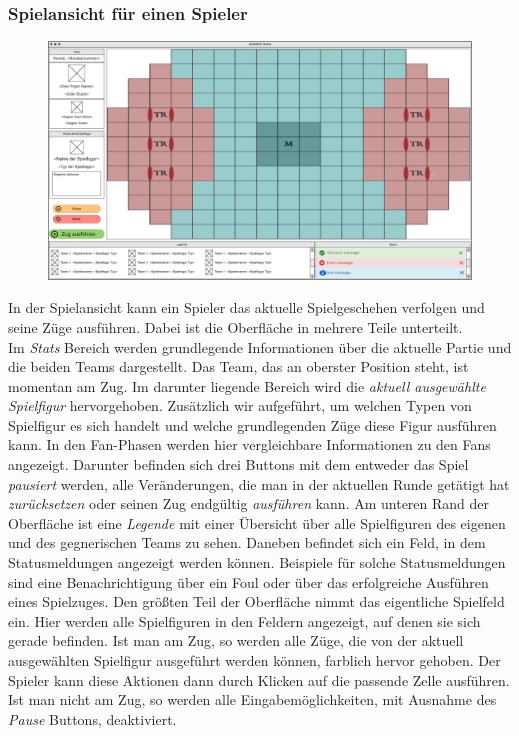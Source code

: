 \subsubsection{Spielansicht für einen Spieler}

\begin{figure}[H]
    \centering
    \includegraphics[width=\textwidth]{images/InGamePlayer.PNG}
\end{figure}

    In der Spielansicht kann ein Spieler das aktuelle Spielgeschehen verfolgen und seine Züge ausführen. Dabei ist die Oberfläche in mehrere Teile unterteilt.\\
    Im \textit{Stats} Bereich werden grundlegende Informationen über die aktuelle Partie und die beiden Teams dargestellt. Das Team, das an oberster Position steht, ist momentan am Zug. Im darunter liegende Bereich wird die \textit{aktuell ausgewählte Spielfigur} hervorgehoben. Zusätzlich wir aufgeführt, um welchen Typen von Spielfigur es sich handelt und welche grundlegenden Züge diese Figur ausführen kann. In den Fan-Phasen werden hier vergleichbare Informationen zu den Fans angezeigt.
    Darunter befinden sich drei Buttons mit dem entweder das Spiel \textit{pausiert} werden, alle Veränderungen, die man in der aktuellen Runde getätigt hat \textit{zurücksetzen} oder seinen Zug endgültig \textit{ausführen} kann. Am unteren Rand der Oberfläche ist eine \textit{Legende} mit einer Übersicht über alle Spielfiguren des eigenen und des gegnerischen Teams zu sehen. Daneben befindet sich ein Feld, in dem Statusmeldungen angezeigt werden können. Beispiele für solche Statusmeldungen sind
    eine Benachrichtigung über ein Foul oder über das erfolgreiche Ausführen eines Spielzuges. Den größten Teil der Oberfläche nimmt das eigentliche Spielfeld ein. Hier werden alle Spielfiguren in den Feldern angezeigt, auf denen sie sich gerade befinden. Ist man am Zug, so werden alle Züge, die von der aktuell ausgewählten Spielfigur ausgeführt werden können, farblich hervor gehoben. Der Spieler kann diese Aktionen dann durch Klicken auf die passende Zelle ausführen. Ist man nicht am
    Zug, so werden alle Eingabemöglichkeiten, mit Ausnahme des \textit{Pause} Buttons, deaktiviert.


